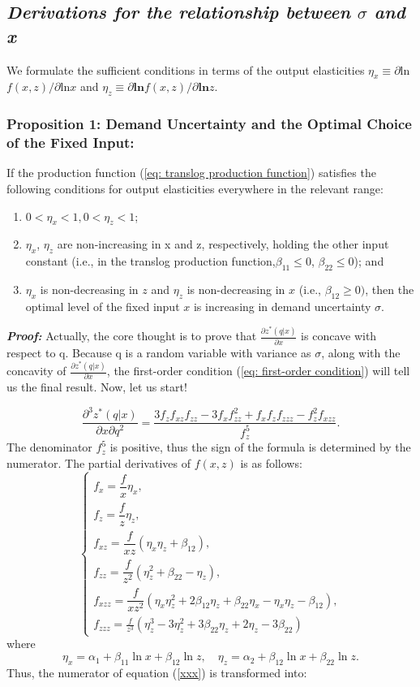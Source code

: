 \documentclass{article}
\begin{document}
\subsection*{\textit{Derivations for the relationship between $\sigma$ and x}}
We formulate the sufficient conditions in terms of the output elasticities $\eta_x\equiv\partial$ln$f(x,z)/\partial$ln$x$ and $\eta_{z}\equiv\partial\mathbf{ln}f(x,z)/\partial\mathbf{ln}z.$

\subsubsection*{Proposition 1: Demand Uncertainty and the Optimal Choice of the Fixed Input:}
If the production function (\ref{eq: translog production function}) satisfies the following conditions for output elasticities everywhere in the relevant range:
\begin{enumerate}[label=(\arabic*)]
    \item $0<\eta_x<1,0<\eta_z<1$;
    \item $\eta_x$, $\eta_z$ are non-increasing in x and z, respectively, holding the other input constant (i.e., in the translog production function,$\beta_{11}\leq0$, $\beta_{22}\leq0$); and 
    \item $\eta_x$ is non-decreasing in $z$ and $\eta_z$ is non-decreasing in $x$ (i.e., $\beta_{12}\geq0)$, then the optimal level of the fixed input $x$ is increasing in demand uncertainty $\sigma.$
\end{enumerate}
\textbf{\textit{Proof:}} Actually, the core thought is to prove that $\frac{\partial z^*(q|x)}{\partial x}$ is concave with respect to q. Because q is a random variable with variance as $\sigma$, along with the concavity of $\frac{\partial z^*(q|x)}{\partial x}$, the first-order condition (\ref{eq: first-order condition}) will tell us the final result. Now, let us start!\par

\begin{equation}
\frac{\partial^3z^*(q|x)}{\partial x\partial q^2}=\frac{3f_zf_{xz}f_{zz}-3f_xf_{zz}^2+f_xf_zf_{zzz}-f_z^2f_{xzz}}{f_z^5}.
\label{xxx}
\end{equation}
The denominator $f_z^5$ is positive, thus the sign of the formula is determined by the numerator. The partial derivatives of $f(x,z)$ is as follows:
\[
\begin{cases}
f_x = \dfrac{f}{x} \eta_x, \\
f_z = \dfrac{f}{z} \eta_z, \\ 
f_{xz} = \dfrac{f}{xz} (\eta_x \eta_z + \beta_{12}), \\
f_{zz} = \dfrac{f}{z^2} (\eta_z^2 + \beta_{22} - \eta_z), \\
f_{xzz} = \dfrac{f}{x z^2} (\eta_x \eta_z^2 + 2 \beta_{12} \eta_z + \beta_{22} \eta_x - \eta_x \eta_z - \beta_{12}),\\
f_{zzz}=\frac{f}{z^{3}}(\eta_{z}^{3}-3\eta_{z}^{2}+3\beta_{22}\eta_{z}+2\eta_{z}-3\beta_{22})
\end{cases}
\]
where
\[
\eta_x = \alpha_1 + \beta_{11} \ln x + \beta_{12} \ln z, \quad \eta_z = \alpha_2 + \beta_{12} \ln x + \beta_{22} \ln z.
\]
Thus, the numerator of equation (\ref{xxx}) is transformed into:
\end{document}
